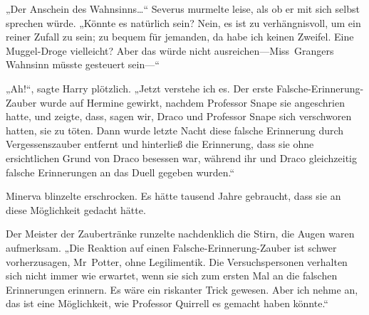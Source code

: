 „Der Anschein des Wahnsinns…“ Severus murmelte leise, als ob er mit sich selbst sprechen würde.
„Könnte es natürlich sein? Nein, es ist zu verhängnisvoll, um ein reiner Zufall zu sein; zu bequem für jemanden, da habe ich keinen Zweifel. Eine Muggel-Droge vielleicht? Aber das würde nicht ausreichen—Miss~Grangers Wahnsinn müsste gesteuert sein—“

„Ah!“, sagte Harry plötzlich.
„Jetzt verstehe ich es. Der erste Falsche-Erinnerung-Zauber wurde auf Hermine gewirkt, nachdem Professor Snape sie angeschrien hatte, und zeigte, dass, sagen wir, Draco und Professor Snape sich verschworen hatten, sie zu töten. Dann wurde letzte Nacht diese falsche Erinnerung durch Vergessenszauber entfernt und hinterließ die Erinnerung, dass sie ohne ersichtlichen Grund von Draco besessen war, während ihr und Draco gleichzeitig falsche Erinnerungen an das Duell gegeben wurden.“

Minerva blinzelte erschrocken. Es hätte tausend Jahre gebraucht, dass sie an diese Möglichkeit gedacht hätte.

Der Meister der Zaubertränke runzelte nachdenklich die Stirn, die Augen waren aufmerksam.
„Die Reaktion auf einen Falsche-Erinnerung-Zauber ist schwer vorherzusagen, Mr~Potter, ohne Legilimentik. Die Versuchspersonen verhalten sich nicht immer wie erwartet, wenn sie sich zum ersten Mal an die falschen Erinnerungen erinnern. Es wäre ein riskanter Trick gewesen. Aber ich nehme an, das ist eine Möglichkeit, wie Professor Quirrell es gemacht haben könnte.“

